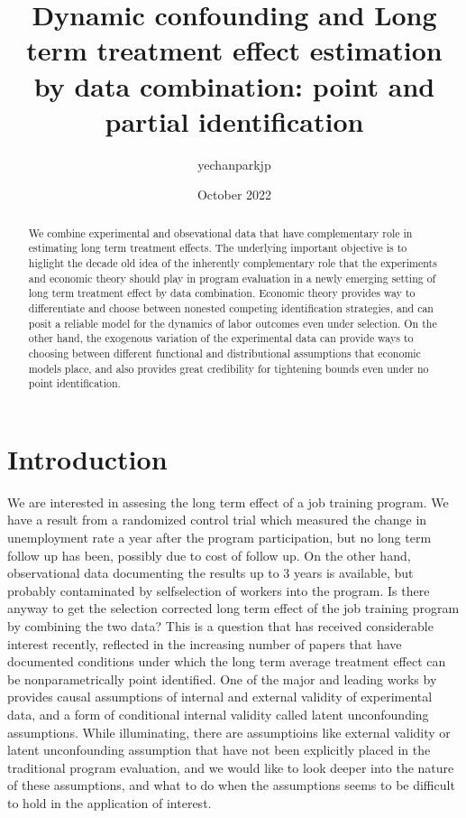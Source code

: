 \documentclass{article}
\title{Dynamic confounding and Long term treatment effect estimation by data combination: point and partial identification}
\author{yechanparkjp}
\date{October 2022}
\begin{document}
\maketitle

\begin{abstract}
    We combine experimental and obsevational data that have complementary role in estimating long term treatment effects. The underlying important objective is to higlight the decade old idea of the inherently complementary role that the experiments and economic theory should play in program evaluation in a newly emerging setting of long term treatment effect by data combination. Economic theory provides way to differentiate and choose between nonested competing identification strategies, and can posit a reliable model for the dynamics of labor outcomes even under selection. On the other hand, the exogenous variation of the experimental data can provide ways to choosing between different functional and distributional assumptions that economic models place, and also provides great credibility for tightening bounds even under no point identification.
\end{abstract}

\section{Introduction}

We are interested in assesing the long term effect of a job training program. We have a result from a randomized control trial which measured the change in unemployment rate a year after the program participation, but no long term follow up has been, possibly due to cost of follow up. On the other hand, observational data documenting the results up to 3 years is available, but probably contaminated by selfselection of workers into the program. Is there anyway to get the selection corrected long term effect of the job training program by combining the two data? This is a question that has received considerable interest recently, reflected in the increasing number of papers that have documented conditions under which the long term average treatment effect can be nonparametrically point identified. One of the major and leading works by \cite{athey 2020 long}  provides causal assumptions of internal and external validity of experimental data, and a form of conditional internal validity called latent unconfounding assumptions. While illuminating, there are assumptioins like external validity or latent unconfounding assumption that have not been explicitly placed in the traditional program evaluation, and we would like to look deeper into the nature of these assumptions, and what to do when the assumptions seems to be difficult to hold in the application of interest. 
\end{document}

